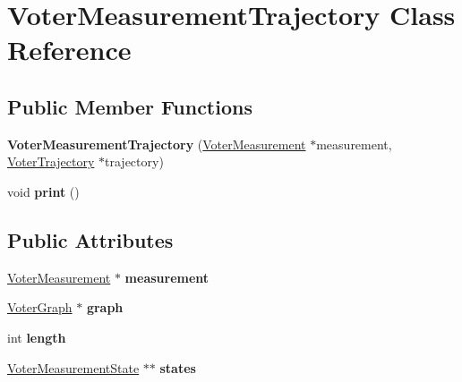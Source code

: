 \hypertarget{class_voter_measurement_trajectory}{\section{Voter\-Measurement\-Trajectory Class Reference}
\label{class_voter_measurement_trajectory}
}
\subsection*{Public Member Functions}
\begin{DoxyCompactItemize}
\item 
\hypertarget{class_voter_measurement_trajectory_aaad656cfffcd452d36642e48d3593fc5}{{\bfseries Voter\-Measurement\-Trajectory} (\hyperlink{class_voter_measurement}{Voter\-Measurement} $\ast$measurement, \hyperlink{class_voter_trajectory}{Voter\-Trajectory} $\ast$trajectory)}\label{class_voter_measurement_trajectory_aaad656cfffcd452d36642e48d3593fc5}

\item 
\hypertarget{class_voter_measurement_trajectory_afc46bed33c05a96e7a4ea735ba7ac144}{void {\bfseries print} ()}\label{class_voter_measurement_trajectory_afc46bed33c05a96e7a4ea735ba7ac144}

\end{DoxyCompactItemize}
\subsection*{Public Attributes}
\begin{DoxyCompactItemize}
\item 
\hypertarget{class_voter_measurement_trajectory_ada8cb1fb7a9559a8ae6501b9b3d8f0db}{\hyperlink{class_voter_measurement}{Voter\-Measurement} $\ast$ {\bfseries measurement}}\label{class_voter_measurement_trajectory_ada8cb1fb7a9559a8ae6501b9b3d8f0db}

\item 
\hypertarget{class_voter_measurement_trajectory_a0bafd05cf7d38e76469dbcca21ac5c92}{\hyperlink{class_voter_graph}{Voter\-Graph} $\ast$ {\bfseries graph}}\label{class_voter_measurement_trajectory_a0bafd05cf7d38e76469dbcca21ac5c92}

\item 
\hypertarget{class_voter_measurement_trajectory_a5447124d24ed50c0ef86ec72f3e0e973}{int {\bfseries length}}\label{class_voter_measurement_trajectory_a5447124d24ed50c0ef86ec72f3e0e973}

\item 
\hypertarget{class_voter_measurement_trajectory_aaca3b94c576c8d83b8cdac6455a503bb}{\hyperlink{class_voter_measurement_state}{Voter\-Measurement\-State} $\ast$$\ast$ {\bfseries states}}\label{class_voter_measurement_trajectory_aaca3b94c576c8d83b8cdac6455a503bb}

\end{DoxyCompactItemize}


